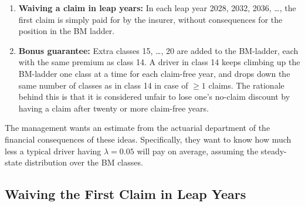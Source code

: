 \documentclass{article}
\begin{document}
\begin{enumerate}
    \item \textbf{Waiving a claim in leap years:} In each leap year 2028, 2032, 2036, \ldots, the first claim is simply paid for by the insurer, without consequences for the position in the BM ladder.
    
    \item \textbf{Bonus guarantee:} Extra classes 15, \ldots, 20 are added to the BM-ladder, each with the same premium as class 14. A driver in class 14 keeps climbing up the BM-ladder one class at a time for each claim-free year, and drops down the same number of classes as in class 14 in case of $\geq 1$ claims. The rationale behind this is that it is considered unfair to lose one's no-claim discount by having a claim after twenty or more claim-free years.
\end{enumerate}
 
The management wants an estimate from the actuarial department of the financial consequences of these ideas. Specifically, they want to know how much less a typical driver having $\lambda = 0.05$ will pay on average, assuming the steady-state distribution over the BM classes.
 
\subsection{Waiving the First Claim in Leap Years}
 
\end{document}
